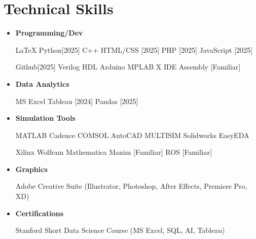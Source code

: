 \documentclass[11pt,a4paper]{article}
\newcommand{\skillcategory}[1]{
  \item
  \textbf{#1}
}
\begin{document}



\section*{Technical Skills}

\begin{itemize}

\skillcategory{Programming/Dev} 
    \textbullet{} LaTeX
    \textbullet{} Python[2025]
    \textbullet{} C++
    \textbullet{} HTML/CSS [2025]
    \textbullet{} PHP [2025]
    \textbullet{} JavaScript [2025]
    
     
    
    \hspace{3.31cm}
    \textbullet{} Github[2025]
    \textbullet{} Verilog HDL
    \textbullet{} Arduino
    \textbullet{} MPLAB X IDE
    \textbullet{} Assembly [Familiar]

\skillcategory{Data Analytics}
    \hspace{0.56cm} 
    \textbullet{} MS Excel
    \textbullet{} Tableau [2024]
    \textbullet{} Pandas [2025]

\skillcategory{Simulation Tools} 
    \hspace{0.16cm}
    \textbullet{} MATLAB
    \textbullet{} Cadence
    \textbullet{} COMSOL
    \textbullet{} AutoCAD
    \textbullet{} MULTISIM
    \textbullet{} Solidworks
    \textbullet{} EasyEDA 

    \hspace{3.31cm}
    \textbullet{} Xilinx
    \textbullet{} Wolfram Mathematica
    \textbullet{} Manim [Familiar]
    \textbullet{} ROS [Familiar]

\skillcategory{Graphics}
    \hspace{1.54cm}
    \textbullet{} Adobe Creative Suite (Illustrator, Photoshop, After Effects, Premiere Pro, XD)

\skillcategory{Certifications}
    \hspace{0.74cm}
    \textbullet{} Stanford Short Data Science Course (MS Excel, SQL, AI, Tableau)
\end{itemize}



\end{document}
